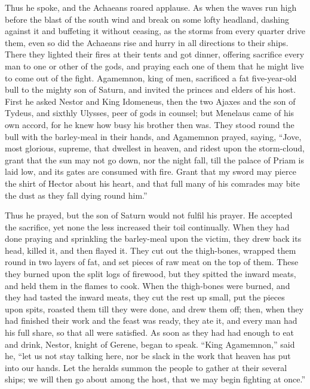 Thus he spoke, and the Achaeans roared applause. As when the waves run
high before the blast of the south wind and break on some lofty headland,
dashing against it and buffeting it without ceasing, as the storms from
every quarter drive them, even so did the Achaeans rise and hurry in all
directions to their ships. There they lighted their fires at their tents
and got dinner, offering sacrifice every man to one or other of the gods,
and praying each one of them that he might live to come out of the fight.
Agamemnon, king of men, sacrificed a fat five-year-old bull to the mighty
son of Saturn, and invited the princes and elders of his host. First he
asked Nestor and King Idomeneus, then the two Ajaxes and the son of
Tydeus, and sixthly Ulysses, peer of gods in counsel; but Menelaus came of
his own accord, for he knew how busy his brother then was. They stood
round the bull with the barley-meal in their hands, and Agamemnon prayed,
saying, “Jove, most glorious, supreme, that dwellest in heaven, and ridest
upon the storm-cloud, grant that the sun may not go down, nor the night
fall, till the palace of Priam is laid low, and its gates are consumed
with fire. Grant that my sword may pierce the shirt of Hector about his
heart, and that full many of his comrades may bite the dust as they fall
dying round him.”

Thus he prayed, but the son of Saturn would not fulfil his prayer. He
accepted the sacrifice, yet none the less increased their toil
continually. When they had done praying and sprinkling the barley-meal
upon the victim, they drew back its head, killed it, and then flayed it.
They cut out the thigh-bones, wrapped them round in two layers of fat, and
set pieces of raw meat on the top of them. These they burned upon the
split logs of firewood, but they spitted the inward meats, and held them
in the flames to cook. When the thigh-bones were burned, and they had
tasted the inward meats, they cut the rest up small, put the pieces upon
spits, roasted them till they were done, and drew them off; then, when
they had finished their work and the feast was ready, they ate it, and
every man had his full share, so that all were satisfied. As soon as they
had had enough to eat and drink, Nestor, knight of Gerene, began to speak.
“King Agamemnon,” said he, “let us not stay talking here, nor be slack in
the work that heaven has put into our hands. Let the heralds summon the
people to gather at their several ships; we will then go about among the
host, that we may begin fighting at once.”

